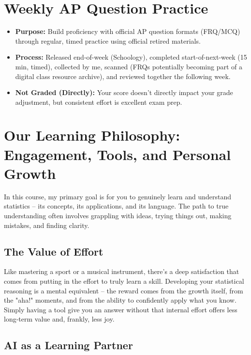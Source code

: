 \documentclass[11pt]{article}
\begin{document}
\section{Weekly AP Question Practice}

\begin{itemize}[leftmargin=*]
  \item \textbf{Purpose:} Build proficiency with official AP question formats (FRQ/MCQ) through regular, timed practice using official retired materials.
  
  \item \textbf{Process:} Released end-of-week (Schoology), completed start-of-next-week (15 min, timed), collected by me, scanned (FRQs potentially becoming part of a digital class resource archive), and reviewed together the following week.
  
  \item \textbf{Not Graded (Directly):} Your score doesn't directly impact your grade adjustment, but consistent effort is excellent exam prep.
\end{itemize}

\section{Our Learning Philosophy: Engagement, Tools, and Personal Growth}

In this course, my primary goal is for you to genuinely learn and understand statistics – its concepts, its applications, and its language. The path to true understanding often involves grappling with ideas, trying things out, making mistakes, and finding clarity.

\subsection{The Value of Effort}

Like mastering a sport or a musical instrument, there's a deep satisfaction that comes from putting in the effort to truly learn a skill. Developing your statistical reasoning is a mental equivalent – the reward comes from the growth itself, from the "aha!" moments, and from the ability to confidently apply what you know. Simply having a tool give you an answer without that internal effort offers less long-term value and, frankly, less joy.

\subsection{AI as a Learning Partner}
\end{document}
